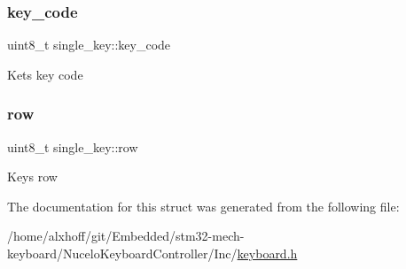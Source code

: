\subsubsection{\texorpdfstring{key\+\_\+code}{key\_code}}
{\footnotesize\ttfamily uint8\+\_\+t single\+\_\+key\+::key\+\_\+code}

Ket\textquotesingle{}s key code \mbox{\label{structsingle__key_a86c0464140fe262bd1f0271a95885733}} 
\subsubsection{\texorpdfstring{row}{row}}
{\footnotesize\ttfamily uint8\+\_\+t single\+\_\+key\+::row}

Key\textquotesingle{}s row 

The documentation for this struct was generated from the following file\+:\begin{DoxyCompactItemize}
\item 
/home/alxhoff/git/\+Embedded/stm32-\/mech-\/keyboard/\+Nucelo\+Keyboard\+Controller/\+Inc/\hyperlink{keyboard_8h}{keyboard.\+h}\end{DoxyCompactItemize}
